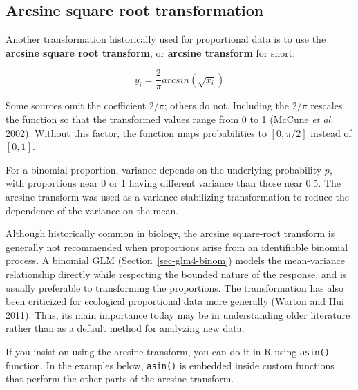 \documentclass[
  13,
  letterpaper,
]{report}
\begin{document}
\subsection{Arcsine square root
transformation}\label{sec-trans-uncommon-asin}

Another transformation historically used for proportional data is to use
the \textbf{arcsine square root transform}, or \textbf{arcsine
transform} for short:

\[y_i=\frac{2}{\pi}arcsin\left(\sqrt{x_i}\right)\]

Some sources omit the coefficient \(2/\pi\); others do not. Including
the \(2/\pi\) rescales the function so that the transformed values range
from 0 to 1 (McCune \emph{et al.} 2002). Without this factor, the
function maps probabilities to \(\left[0,\pi/2\right]\) instead of
\(\left[0,1\right]\).

For a binomial proportion, variance depends on the underlying
probability \(p\), with proportions near 0 or 1 having different
variance than those near 0.5. The arcsine transform was used as a
variance-stabilizing transformation to reduce the dependence of the
variance on the mean.

Although historically common in biology, the arcsine square-root
transform is generally not recommended when proportions arise from an
identifiable binomial process. A binomial GLM
(Section~\ref{sec-glm4-binom}) models the mean-variance relationship
directly while respecting the bounded nature of the response, and is
usually preferable to transforming the proportions. The transformation
has also been criticized for ecological proportional data more generally
(Warton and Hui 2011). Thus, its main importance today may be in
understanding older literature rather than as a default method for
analyzing new data.

If you insist on using the arcsine transform, you can do it in R using
\texttt{asin()} function. In the examples below, \texttt{asin()} is
embedded inside custom functions that perform the other parts of the
arcsine transform.
\end{document}
